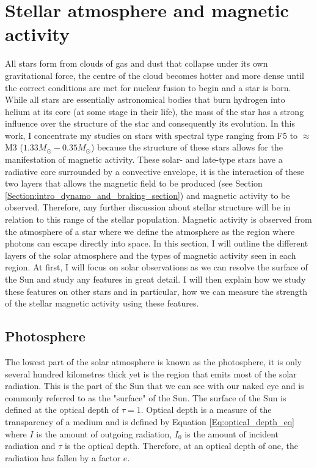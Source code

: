 \section{Stellar atmosphere and magnetic activity}
\label{Section:intro_stellar_structure}

All stars form from clouds of gas and dust that collapse under its own gravitational force, the centre of the cloud becomes hotter and more dense until the correct conditions are met for nuclear fusion to begin and a star is born. While all stars are essentially astronomical bodies that burn hydrogen into helium at its core (at some stage in their life), the mass of the star has a strong influence over the structure of the star and consequently its evolution. In this work, I concentrate my studies on stars with spectral type ranging from F5 to $\approx$ M3 ($1.33 M_{\odot} - 0.35 M_{\odot}$) because the structure of these stars allows for the manifestation of magnetic activity. These solar- and late-type stars have a radiative core surrounded by a convective envelope, it is the interaction of these two layers that allows the magnetic field to be produced (see Section \ref{Section:intro_dynamo_and_braking_section}) and magnetic activity to be observed. Therefore, any further discussion about stellar structure will be in relation to this range of the stellar population. Magnetic activity is observed from the atmosphere of a star where we define the atmosphere as the region where photons can escape directly into space. In this section, I will outline the different layers of the solar atmosphere and the types of magnetic activity seen in each region. At first, I will focus on solar observations as we can resolve the surface of the Sun and study any features in great detail. I will then explain how we study these features on other stars and in particular, how we can measure the strength of the stellar magnetic activity using these features.

\subsection{Photosphere}
\label{Chp1_photosphere}

The lowest part of the solar atmosphere is known as the photosphere, it is only several hundred kilometres thick yet is the region that emits most of the solar radiation. This is the part of the Sun that we can see with our naked eye and is commonly referred to as the "surface" of the Sun. The surface of the Sun is defined at the optical depth of $\tau = 1$. Optical depth is a measure of the transparency of a medium and is defined by Equation \ref{Eq:optical_depth_eq} where $I$ is the amount of outgoing radiation, $I_{0}$ is the amount of incident radiation and $\tau$ is the optical depth. Therefore, at an optical depth of one, the radiation has fallen by a factor $e$.

